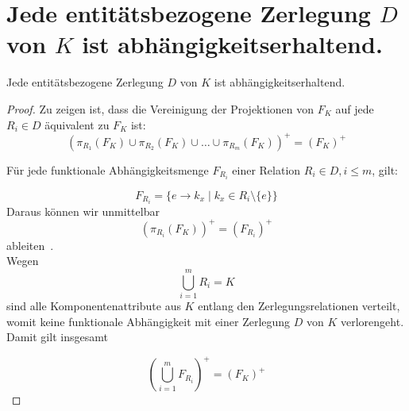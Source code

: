 \chapter{Jede entitätsbezogene Zerlegung $D$ von $K$ ist abhängigkeitserhaltend.}

\begin{lemma}\label{lem:k_abhaengigkeitserhalten}
    Jede entitätsbezogene Zerlegung $D$ von $K$ ist abhängigkeitserhaltend.
\end{lemma}
\begin{proof}
    Zu zeigen ist, dass die Vereinigung der Projektionen von $F_{K}$ auf jede $R_{i} \in D$ äquivalent zu $F_{K}$ ist:
    \[
        (\pi_{R_{1}}(F_{K}) \cup \pi_{R_{2}}(F_{K})  \cup \ldots \cup \pi_{R_{m}}(F_{K}))^+ = (F_{K})^+
    \]
    \smallskip

    \noindent
    Für jede funktionale Abhängigkeitsmenge $F_{R_{i}}$ einer Relation $R_{i} \in D, i \leq m$, gilt:

    \[
        F_{R_{i}} = \{e \rightarrow k_x \mid k_x \in R_{i} \setminus \{e\} \}
    \]
    \medskip
    \noindent
    Daraus können wir unmittelbar
    \[
        (\pi_{R_{i}}(F_{K}))^+ = (F_{R_{i}})^+
    \]
    \noindent
    ableiten~\cite[S. 339--340]{EN11}.\\

    \noindent
    Wegen
    \[
        \bigcup_{i=1}^{m} R_{i} = K
    \]
    sind alle Komponentenattribute aus $K$ entlang den Zerlegungsrelationen verteilt, womit keine funktionale Abhängigkeit mit einer Zerlegung $D$ von $K$ verlorengeht.
    Damit gilt insgesamt

    \[
        \left(\bigcup_{i=1}^m F_{R_{i}}\right)^+ = (F_{K})^+
    \]
\end{proof}
\bigskip